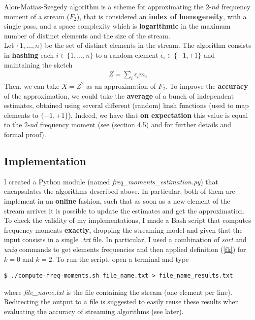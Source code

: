 Alon-Matias-Szegedy algorithm is a scheme for approximating the $2\text{-}nd$ frequency moment of a stream ($F_2$), that is considered an \textbf{index of homogeneity}, with a single pass, and a space complexity which is \textbf{logarithmic} in the maximum number of distinct elements and the size of the stream.\\
Let $\{1,\ldots,n\}$ be the set of distinct elements in the stream. The algorithm consists in \textbf{hashing} each $i \in \{1,\ldots,n\}$ to a random element $\epsilon_i \in \{-1,+1\}$ and maintaining the sketch
\begin{align*}
	Z = \sum_{i} \epsilon_i m_i
\end{align*}
Then, we can take $X = Z^2$ as an approximation of $F_2$. To improve the \textbf{accuracy} of the approximation, we could take the \textbf{average} of a bunch of independent estimates, obtained using several different (random) hash functions (used to map elements to $\{-1,+1\}$). Indeed, we have that \textbf{on expectation} this value is equal to the $2\text{-}nd$ frequency moment (see \cite{mmd} (section 4.5) and \cite{dm-streams} for further details and formal proof).


\subsection{Implementation}

I created a Python module (named \textit{freq\_moments\_estimation.py}) that encapsulates the algorithms described above. In particular, both of them are implement in an \textbf{online} fashion, such that as soon as a new element of the stream arrives it is possible to update the estimates and get the approximation.\\
To check the validity of my implementations, I made a Bash script that computes frequency moments \textbf{exactly}, dropping the streaming model and given that the input consists in a single \textit{.txt} file. In particular, I used a combination of \textit{sort} and \textit{uniq} commands to get elements frequencies and then applied definition (\ref{fk}) for $k = 0$ and $k = 2$. To run the script, open a terminal and type
\begin{lstlisting}
$ ./compute-freq-moments.sh file_name.txt > file_name_results.txt
\end{lstlisting}
where \textit{file\_name.txt} is the file containing the stream (one element per line). Redirecting the output to a file is suggested to easily reuse these results when evaluating the accuracy of streaming algorithms (see later).\\

